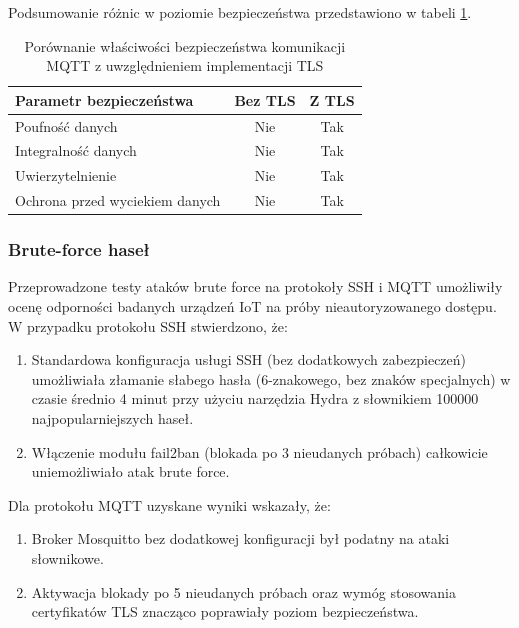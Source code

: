 Podsumowanie różnic w poziomie bezpieczeństwa przedstawiono w tabeli \ref{tab:security_comparison}.
\begin{table}[h]
    \centering
    \caption{Porównanie właściwości bezpieczeństwa komunikacji MQTT z uwzględnieniem implementacji TLS}
    \label{tab:security_comparison}
    \begin{tabular}{|l|c|c|}
        \hline
        \textbf{Parametr bezpieczeństwa} & \textbf{Bez TLS} & \textbf{Z TLS} \\ \hline
        Poufność danych & Nie & Tak \\ \hline
        Integralność danych & Nie & Tak \\ \hline
        Uwierzytelnienie & Nie & Tak \\ \hline
        Ochrona przed wyciekiem danych & Nie & Tak \\ \hline
    \end{tabular}
\end{table}

\subsubsection{Brute-force haseł}
Przeprowadzone testy ataków brute force na protokoły SSH i MQTT umożliwiły ocenę odporności badanych urządzeń IoT na próby nieautoryzowanego dostępu. W przypadku protokołu SSH stwierdzono, że:
\begin{enumerate}
    \item Standardowa konfiguracja usługi SSH (bez dodatkowych zabezpieczeń) umożliwiała złamanie słabego hasła (6-znakowego, bez znaków specjalnych) w czasie średnio 4 minut przy użyciu narzędzia Hydra z słownikiem 100000 najpopularniejszych haseł.
    \item Włączenie modułu fail2ban (blokada po 3 nieudanych próbach) całkowicie uniemożliwiało atak brute force.
\end{enumerate}

Dla protokołu MQTT uzyskane wyniki wskazały, że:
\begin{enumerate}
    \item Broker Mosquitto bez dodatkowej konfiguracji był podatny na ataki słownikowe.
    \item Aktywacja blokady po 5 nieudanych próbach oraz wymóg stosowania certyfikatów TLS znacząco poprawiały poziom bezpieczeństwa.
\end{enumerate}

